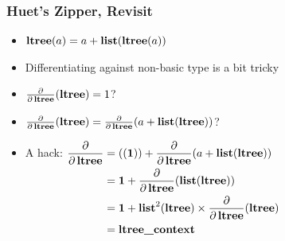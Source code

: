 \begin{frame}
\frametitle{Huet's Zipper, Revisit}

\begin{itemize}
\item $\Fltree(a) = a + \Flist(\Fltree(a))$
\item Differentiating against non-basic type is a bit tricky
\item $\frac{\partial}{\partial \Fltree}(\Fltree) = 1$?
\item $\frac{\partial}{\partial \Fltree}(\Fltree) = \frac{\partial}{\partial \Fltree}(a + \Flist(\Fltree))$?
\item A hack:
$\begin{aligned}[t]
\frac{\partial}{\partial \Fltree}
&= \mathbf{((1))} + \frac{\partial}{\partial \Fltree}(
a + \Flist(\Fltree))\\
&= \mathbf{1} + \frac{\partial}{\partial \Fltree}(\Flist(\Fltree))\\
&= \mathbf{1} + \Flist^2(\Fltree) \times \frac{\partial}{\partial \Fltree}(\Fltree) \\
&= \Fdltree
\end{aligned}$
\end{itemize}
\end{frame}

